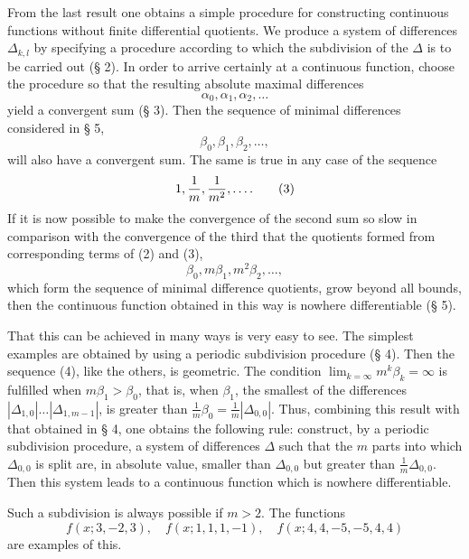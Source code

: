 From the last result one obtains a simple procedure for constructing continuous functions without finite differential quotients. We produce a system of differences $\Delta_{k,l}$ by specifying a procedure according to which the subdivision of the $\Delta$ is to be carried out (§ 2). In order to arrive certainly at a continuous function, choose the procedure so that the resulting absolute maximal differences
\begin{equation}
 \alpha_0,\alpha_1,\alpha_2,\ldots
\tag{1}
\end{equation}
yield a convergent sum (§ 3). Then the sequence of minimal differences considered in § 5,
\begin{equation}
 \beta_0,\beta_1,\beta_2,\ldots,
\tag{2}
\end{equation}
will also have a convergent sum. The same is true in any case of the sequence
\begin{equation}
 1,{1\over m},{1\over m^2},\ldots.
\tag{3}
\end{equation}
If it is now possible to make the convergence of the second sum so slow in comparison with the convergence of the third that the quotients formed from corresponding terms of (2) and (3),
\begin{equation}
 \beta_0,m\beta_1,m^2\beta_2,\ldots,
\tag{4}
\end{equation}
which form the sequence of minimal difference quotients, grow beyond all bounds, then the continuous function obtained in this way is nowhere differentiable (§ 5).

That this can be achieved in many ways is very easy to see. The simplest examples are obtained by using a periodic subdivision procedure (§ 4). Then the sequence (4), like the others, is geometric. The condition $\lim_{k=\infty}m^k\beta_k=\infty$ is fulfilled when $m\beta_1>\beta_0$, that is, when $\beta_1$, the smallest of the differences $|\Delta_{1,0}|\ldots|\Delta_{1,m-1}|$, is greater than $\frac1m\beta_0=\frac1m|\Delta_{0,0}|$. Thus, combining this result with that obtained in § 4, one obtains the following rule: construct, by a periodic subdivision procedure, a system of differences $\Delta$ such that the $m$ parts into which $\Delta_{0,0}$ is split are, in absolute value, smaller than $\Delta_{0,0}$ but greater than $\frac1m\Delta_{0,0}$. Then this system leads to a continuous function which is nowhere differentiable.

Such a subdivision is always possible if $m>2$. The functions
\[
 f(x;3,-2,3),\quad f(x;1,1,1,-1),\quad f(x;4,4,-5,-5,4,4)
\]
are examples of this.

